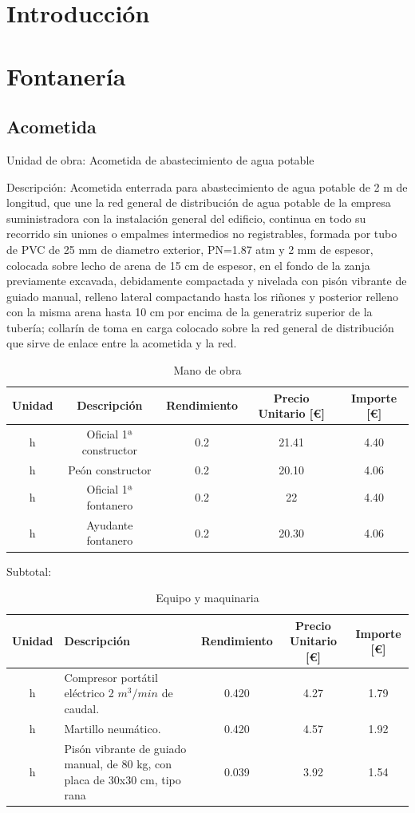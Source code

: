 \documentclass[../main.tex]{subfiles}
\begin{document}
\section{Introducción}

\section{Fontanería}

\subsection{Acometida}

Unidad de obra: Acometida de abastecimiento de agua potable

Descripción: Acometida enterrada para abastecimiento de agua potable de 2 m de longitud, que une la red general de distribución de agua potable de la empresa suministradora con la instalación general del edificio, continua en todo su recorrido sin uniones o empalmes intermedios no registrables, formada por tubo de PVC de 25 mm de diametro exterior, PN=1.87 atm y 2 mm de espesor, colocada sobre lecho de arena de 15 cm de espesor, en el fondo de la zanja previamente excavada, debidamente compactada y nivelada con pisón vibrante de guiado manual, relleno lateral compactando hasta los riñones y posterior relleno con la misma arena hasta 10 cm por encima de la generatriz superior de la tubería; collarín de toma en carga colocado sobre la red general de distribución que sirve de enlace entre la acometida y la red.

\begin{table}[H]
    \centering
    \begin{tabular}{c|c|c|c|c}
    Unidad & Descripción & Rendimiento & Precio Unitario [€] & Importe [€] \\ \hline
    h&Oficial 1ª constructor & 0.2 & 21.41 & 4.40 \\
    h&Peón constructor & 0.2 & 20.10 & 4.06 \\
    h&Oficial 1ª fontanero & 0.2 & 22 & 4.40 \\
    h&Ayudante fontanero & 0.2 & 20.30 & 4.06 \\
    
    \end{tabular}
    \caption{Mano de obra}
\end{table}

Subtotal:

\begin{table}[H]
    \centering
    \begin{tabular}{c|p{5.5cm}|c|c|c}
    Unidad & Descripción & Rendimiento & Precio Unitario [€] & Importe [€] \\ \hline
    h& Compresor portátil eléctrico 2 $ m^3/min$ de caudal. & 0.420 & 4.27 & 1.79 \\
    h&Martillo neumático. & 0.420 & 4.57 & 1.92 \\
    h&Pisón vibrante de guiado manual, de 80 kg, con placa de 30x30 cm, tipo rana & 0.039 & 3.92 & 1.54 \\
    
    \end{tabular}
    \caption{Equipo y maquinaria}
\end{table}
\end{document}
